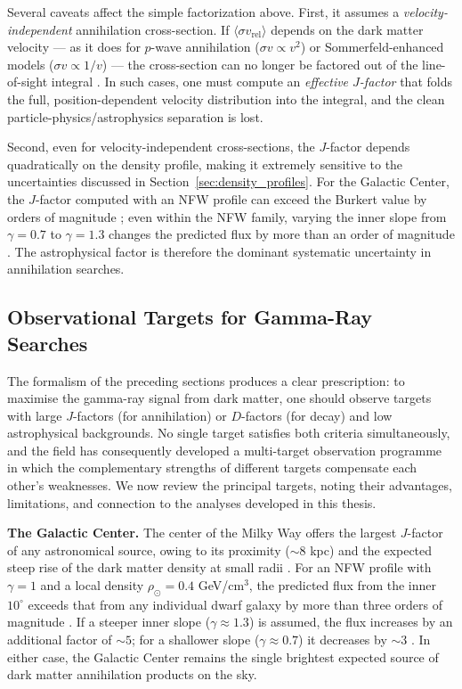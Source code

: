 Several caveats affect the simple factorization above.
First, it assumes a \textit{velocity-independent} annihilation cross-section.
If $\langle \sigma v_\text{rel} \rangle$ depends on the dark matter velocity --- as it does for $p$-wave annihilation ($\sigma v \propto v^2$) or Sommerfeld-enhanced models ($\sigma v \propto 1/v$) --- the cross-section can no longer be factored out of the line-of-sight integral \cite{Cirelli:2024ssz}.
In such cases, one must compute an \textit{effective $J$-factor} that folds the full, position-dependent velocity distribution into the integral, and the clean particle-physics/astrophysics separation is lost.

Second, even for velocity-independent cross-sections, the $J$-factor depends quadratically on the density profile, making it extremely sensitive to the uncertainties discussed in Section~\ref{sec:density_profiles}.
For the Galactic Center, the $J$-factor computed with an NFW profile can exceed the Burkert value by orders of magnitude \cite{Cirelli:2024ssz}; even within the NFW family, varying the inner slope from $\gamma = 0.7$ to $\gamma = 1.3$ changes the predicted flux by more than an order of magnitude \cite{Hooper:2024}.
The astrophysical factor is therefore the dominant systematic uncertainty in annihilation searches.

\subsection{Observational Targets for Gamma-Ray Searches}
\label{sec:targets}

The formalism of the preceding sections produces a clear prescription: to maximise the gamma-ray signal from dark matter, one should observe targets with large $J$-factors (for annihilation) or $D$-factors (for decay) and low astrophysical backgrounds.
No single target satisfies both criteria simultaneously, and the field has consequently developed a multi-target observation programme in which the complementary strengths of different targets compensate each other's weaknesses.
We now review the principal targets, noting their advantages, limitations, and connection to the analyses developed in this thesis.

\textbf{The Galactic Center.}
The center of the Milky Way offers the largest $J$-factor of any astronomical source, owing to its proximity ($\sim 8$ kpc) and the expected steep rise of the dark matter density at small radii \cite{Hooper:2024}.
For an NFW profile with $\gamma = 1$ and a local density $\rho_\odot = 0.4$ GeV/cm$^3$, the predicted flux from the inner $10^\circ$ exceeds that from any individual dwarf galaxy by more than three orders of magnitude \cite{Hooper:2024}.
If a steeper inner slope ($\gamma \approx 1.3$) is assumed, the flux increases by an additional factor of $\sim 5$; for a shallower slope ($\gamma \approx 0.7$) it decreases by $\sim 3$ \cite{Hooper:2024}.
In either case, the Galactic Center remains the single brightest expected source of dark matter annihilation products on the sky.

